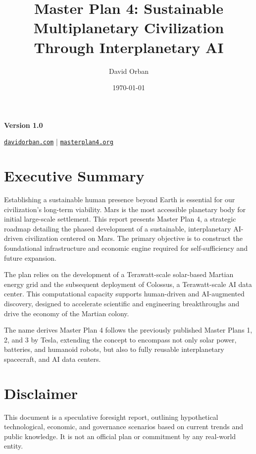 \documentclass[fontsize=10pt, oneside, DIV=calc]{scrartcl}
\title{Master Plan 4: Sustainable Multiplanetary Civilization Through Interplanetary AI}
\author{David Orban}
\date \today
\begin{document}
\setcounter{page}{2}
\maketitle
\begin{center}
\textbf{Version 1.0}
\end{center}

\begin{center}
\href{https://davidorban.com}{\texttt{davidorban.com}} \quad | \quad
\href{https://masterplan4.org}{\texttt{masterplan4.org}}
\end{center}

\section*{Executive Summary}

Establishing a sustainable human presence beyond Earth is essential for our civilization's long-term viability. Mars is the most accessible planetary body for initial large-scale settlement. This report presents Master Plan 4, a strategic roadmap detailing the phased development of a sustainable, interplanetary AI-driven civilization centered on Mars. The primary objective is to construct the foundational infrastructure and economic engine required for self-sufficiency and future expansion.

The plan relies on the development of a Terawatt-scale solar-based Martian energy grid and the subsequent deployment of Colossus, a Terawatt-scale AI data center. This computational capacity supports human-driven and AI-augmented discovery, designed to accelerate scientific and engineering breakthroughs and drive the economy of the Martian colony.

The name derives Master Plan 4 follows the previously published Master Plans 1, 2, and 3 by Tesla, extending the concept to encompass not only solar power, batteries, and humanoid robots, but also to fully reusable interplanetary spacecraft, and AI data centers.

\section*{Disclaimer}
This document is a speculative foresight report, outlining hypothetical technological, economic, and governance scenarios based on current trends and public knowledge. It is not an official plan or commitment by any real-world entity.
\end{document}
